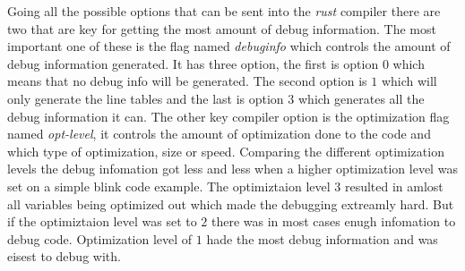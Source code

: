
Going all the possible options that can be sent into the \emph{rust} compiler there are two that are key for getting the most amount of debug information.
The most important one of these is the flag named \emph{debuginfo} which controls the amount of debug information generated.
It has three option, the first is option $0$ which means that no debug info will be generated.
The second option is $1$ which will only generate the line tables and the last is option $3$ which generates all the debug information it can.
The other key compiler option is the optimization flag named \emph{opt-level}, it controls the amount of optimization done to the code and which type of optimization, size or speed.
Comparing the different optimization levels the debug infomation got less and less when a higher optimization level was set on a simple blink code example.
The optimiztaion level $3$ resulted in amlost all variables being optimized out which made the debugging extreamly hard.
But if the optimiztaion level was set to $2$ there was in most cases enugh infomation to debug code.
Optimization level of $1$ hade the most debug information and was eisest to debug with.

